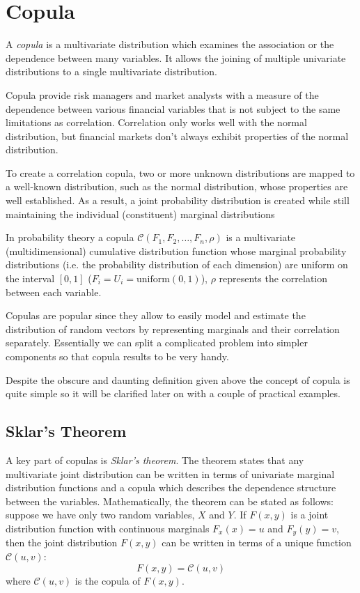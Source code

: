 \section{Copula}
\label{copula}

A \emph{copula} is a multivariate distribution which examines the association or the dependence between many variables. It allows the joining of multiple univariate distributions to a single multivariate distribution.

Copula provide risk managers and market analysts with a measure of the dependence between various financial variables that is not subject to the same limitations as correlation. Correlation only works well with the normal distribution, but financial markets don't always exhibit properties of the normal distribution.

To create a correlation copula, two or more unknown distributions are mapped to a well-known distribution, such as the normal distribution, whose properties are well established. As a result, a joint probability distribution is created while still maintaining the individual (constituent) marginal distributions

In probability theory a copula $\mathcal{C}(F_1, F_2, \ldots, F_n, \rho)$ is a multivariate (multidimensional) cumulative distribution function whose marginal probability distributions (i.e. the probability distribution of each dimension) are uniform on the interval $[0, 1]$ ($F_i = U_i =\mathrm{uniform}(0,1)$), \(\rho\) represents the correlation between each variable.

Copulas are popular since they allow to easily model and estimate the distribution of random vectors by representing marginals and their correlation separately.
Essentially we can split a complicated problem into simpler components so that copula results to be very handy.

Despite the obscure and daunting definition given above the concept of copula is quite simple so it will be clarified later on with a couple of practical examples.

\subsection{Sklar's Theorem}

A key part of copulas is \emph{Sklar’s theorem}. The theorem states that any multivariate joint distribution can be written in terms of univariate marginal distribution functions and a copula which describes the dependence structure between the variables. Mathematically, the theorem can be stated as follows: suppose we have only two random variables, $X$ and $Y$. If $F(x,y)$ is a joint distribution function with continuous marginals 
$F_x(x)=u$ and $F_y(y)=v$, then the joint distribution $F(x,y)$ can be written in terms of a unique function $\mathcal{C}(u,v)$:
\begin{equation}
F(x,y)=\mathcal{C}(u,v)
\end{equation}
\noindent
where $\mathcal{C}(u,v)$ is the copula of $F(x,y)$.

